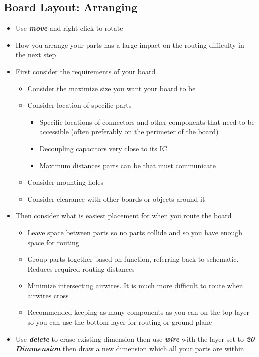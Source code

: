 \documentclass{article}
\begin{document}
\subsection{Board Layout: Arranging}
\begin{itemize}
    \item Use \textit{\textbf{move}} and right click to rotate
    \item How you arrange your parts has a large impact on the routing difficulty in the next step
    \item First consider the requirements of your board
    \begin{itemize}
        \item Consider the maximize size you want your board to be
        \item Consider location of specific parts
        \begin{itemize}
            \item Specific locations of connectors and other components that need to be accessible (often preferably on the perimeter of the board)
            \item Decoupling capacitors very close to its IC
            \item Maximum distances parts can be that must communicate
        \end{itemize}
        \item Consider mounting holes
        \item Consider clearance with other boards or objects around it
    \end{itemize}
    \item Then consider what is easiest placement for when you route the board
    \begin{itemize}
        \item Leave space between parts so no parts collide and so you have enough space for routing
        \item Group parts together based on function, referring back to schematic. Reduces required routing distances
        \item Minimize intersecting airwires. It is much more difficult to route when airwires cross
        \item Recommended keeping as many components as you can on the top layer so you can use the bottom layer for routing or ground plane
    \end{itemize}
    \item Use \textit{\textbf{delete}} to erase existing dimension then use
    \textit{\textbf{wire}} with the layer set to \textit{\textbf{20 Dimmension}} then draw a new dimension which all your parts are within
\end{itemize}
\end{document}
